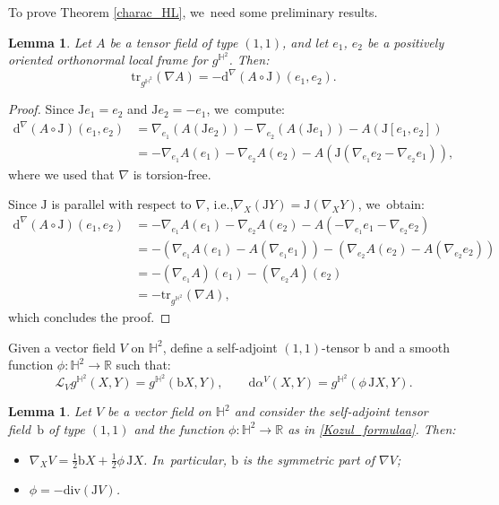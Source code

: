 \documentclass[11pt]{article}
\newcommand{\ie}{i.e.,\xspace}
\theoremstyle{plain}
\newtheorem{lemma}[cor]{Lemma}
\theoremstyle{definition}
\begin{document}
To prove Theorem \ref{charac_HL}, we~need some preliminary results.

\begin{lemma}\label{techniqual_computation}
Let \(A \) be a tensor field of type \((1,1) \), and let \(e_1 \), \(e_2 \) be a positively oriented orthonormal local frame for \(g^{\mathbb{H}^2} \). Then:
\[
\mathrm{tr}_{g^{\mathbb{H}^2}}(\nabla A) = -\mathrm{d}^{\nabla}(A \circ \mathrm{J})(e_1,e_2).
\]
\end{lemma}

\begin{proof}
Since \(\mathrm{J}e_1 = e_2 \) and \(\mathrm{J}e_2 = -e_1 \), we~compute:
\begin{align*}
\mathrm{d}^{\nabla}(A \circ \mathrm{J})(e_1,e_2)
&= \nabla_{e_1} (A(\mathrm{J}e_2)) - \nabla_{e_2} (A(\mathrm{J}e_1)) - A(\mathrm{J}[e_1, e_2]) \\
&= -\nabla_{e_1} A(e_1) - \nabla_{e_2} A(e_2) - A(\mathrm{J}(\nabla_{e_1}e_2 - \nabla_{e_2}e_1)),
\end{align*}
where we used that \(\nabla \) is torsion-free.

Since \(\mathrm{J} \) is parallel with respect to \(\nabla \), \ie \(\nabla_X(\mathrm{J}Y) = \mathrm{J}(\nabla_X Y) \), we~obtain:
\begin{align*}
\mathrm{d}^{\nabla}(A \circ \mathrm{J})(e_1,e_2)
&= -\nabla_{e_1} A(e_1) - \nabla_{e_2} A(e_2) - A(-\nabla_{e_1}e_1 - \nabla_{e_2}e_2) \\
&= -\left(\nabla_{e_1} A(e_1) - A(\nabla_{e_1} e_1) \right) - \left(\nabla_{e_2} A(e_2) - A(\nabla_{e_2} e_2) \right) \\
&= -(\nabla_{e_1} A)(e_1) - (\nabla_{e_2} A)(e_2) \\
&= -\mathrm{tr}_{g^{\mathbb{H}^2}}(\nabla A),
\end{align*}
which concludes the proof.
\end{proof}

Given a vector field $V$ on $\mathbb{H}^2$, define a self-adjoint $(1,1)$-tensor $\mathrm{b}$ and a smooth function $\phi:\mathbb{H}^2\to\mathbb{R}$ such that:
\begin{equation}\label{Kozul_formulaa}
\mathcal{L}_Vg^{\mathbb{H}^2}(X,Y)=g^{\mathbb{H}^2}(\mathrm{b} X,Y),
\qquad
\mathrm{d}\alpha^V(X,Y)=g^{\mathbb{H}^2}(\phi\, \mathrm{J} X,Y).
\end{equation}

\begin{lemma}\label{Kozul_formula}
Let $V$ be a vector field on $\mathbb{H}^2$ and consider the self-adjoint tensor field~$\mathrm{b}$ of type $(1,1)$ and the function $\phi:\mathbb{H}^2\to \mathbb{R}$ as in \eqref{Kozul_formulaa}. Then:
\begin{itemize}
\item $\nabla_X V = \frac{1}{2} \mathrm{b} X + \frac{1}{2} \phi\, \mathrm{J} X$. In~particular, $\mathrm{b}$ is the symmetric part of $\nabla V$;
\item $\phi = -\mathrm{div}(\mathrm{J} V)$.
\end{itemize}

\end{lemma}
\end{document}
